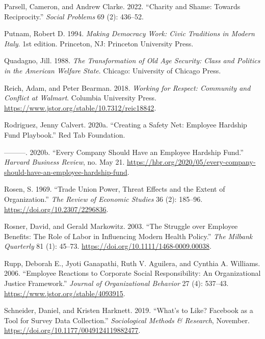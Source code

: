 \documentclass[
  11pt,
  oneside]{article}
\newlength{\cslhangindent}
\newenvironment{CSLReferences}[2] %
 {\begin{list}{}{%
  \setlength{\itemindent}{0pt}
  \setlength{\leftmargin}{0pt}
  \setlength{\parsep}{0pt}
  \ifodd #1
   \setlength{\leftmargin}{\cslhangindent}
   \setlength{\itemindent}{-1\cslhangindent}
  \fi
  \setlength{\itemsep}{#2\baselineskip}}}
 {\end{list}}
\begin{document}
\begin{CSLReferences}{1}{0}
Parsell, Cameron, and Andrew Clarke. 2022. {``Charity and Shame: Towards Reciprocity.''} \emph{Social Problems} 69 (2): 436--52.

Putnam, Robert D. 1994. \emph{Making {Democracy} {Work}: {Civic} {Traditions} in {Modern} {Italy}}. 1st edition. Princeton, NJ: Princeton University Press.

Quadagno, Jill. 1988. \emph{The {Transformation} of {Old} {Age} {Security}: {Class} and {Politics} in the {American} {Welfare} {State}}. Chicago: University of Chicago Press.

Reich, Adam, and Peter Bearman. 2018. \emph{Working for {Respect}: {Community} and {Conflict} at {Walmart}}. Columbia University Press. \url{https://www.jstor.org/stable/10.7312/reic18842}.

Rodriguez, Jenny Calvert. 2020a. {``Creating a {Safety} {Net}: {Employee} {Hardship} {Fund} {Playbook}.''} Red Tab Foundation.

---------. 2020b. {``Every {Company} {Should} {Have} an {Employee} {Hardship} {Fund}.''} \emph{Harvard Business Review}, no. May 21. \url{https://hbr.org/2020/05/every-company-should-have-an-employee-hardship-fund}.

Rosen, S. 1969. {``Trade {Union Power}, {Threat Effects} and the {Extent} of {Organization}.''} \emph{The Review of Economic Studies} 36 (2): 185--96. \url{https://doi.org/10.2307/2296836}.

Rosner, David, and Gerald Markowitz. 2003. {``The {Struggle} over {Employee} {Benefits}: {The} {Role} of {Labor} in {Influencing} {Modern} {Health} {Policy}.''} \emph{The Milbank Quarterly} 81 (1): 45--73. \url{https://doi.org/10.1111/1468-0009.00038}.

Rupp, Deborah E., Jyoti Ganapathi, Ruth V. Aguilera, and Cynthia A. Williams. 2006. {``Employee {Reactions} to {Corporate Social Responsibility}: {An Organizational Justice Framework}.''} \emph{Journal of Organizational Behavior} 27 (4): 537--43. \url{https://www.jstor.org/stable/4093915}.

Schneider, Daniel, and Kristen Harknett. 2019. {``What's to {Like}? {Facebook} as a {Tool} for {Survey} {Data} {Collection}.''} \emph{Sociological Methods \& Research}, November. \url{https://doi.org/10.1177/0049124119882477}.


\end{CSLReferences}
\end{document}
